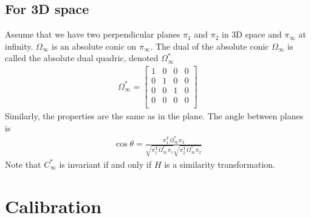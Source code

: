 \documentclass[11pt]{article}
\begin{document}
\subsection{For 3D space}
Assume that we have two perpendicular planes $\pi_1$ and $\pi_2$ in 3D space and $\pi_\infty$ at infinity. $\Omega_\infty$ is an absolute conic on $\pi_\infty$. The dual of the absolute conic $\Omega_\infty$ is called the absolute dual quadric, denoted $\Omega^\ast_\infty$
\begin{align}
\Omega^\ast_\infty = \left[
\begin{array}{cccc}
1 & 0 & 0 & 0 \\
0 & 1 & 0 & 0 \\
0 & 0 & 1 & 0 \\
0 & 0 & 0 & 0 \\
\end{array}\right]
\end{align}
Similarly, the properties are the same as in the plane. The angle between planes is
\begin{align}
\cos\theta = \frac{\pi^\mathsf{T}_1\Omega^\ast_\infty\pi_2}{\sqrt{\pi^\mathsf{T}_1\Omega^\ast_\infty\pi_1}\sqrt{\pi^\mathsf{T}_2\Omega^\ast_\infty\pi_2}}
\end{align}
Note that $C^\ast_\infty$ is invariant if and only if $H$ is a similarity transformation. 


\newpage
\section{Calibration} 
\end{document}
